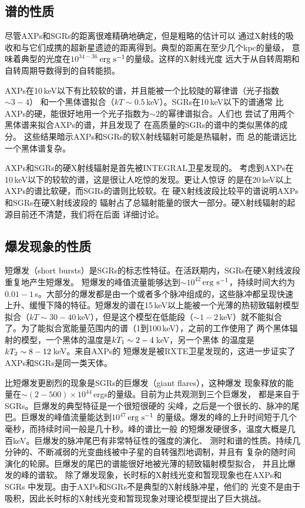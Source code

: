 \subsection{谱的性质}

尽管AXPs和SGRs的距离很难精确地确定，但是粗略的估计可以
通过X射线的吸收和与它们成携的超新星遗迹的距离得到。典型的距离在至少几个kpc的量级，
意味着典型的光度在$10^{34-36}$\,$\rm{erg\ s^{-1}}$的量级。这样的X射线光度
远大于从自转周期和自转周期导数得到的自转能损。

AXPs在10\,keV以下有比较软的谱，并且能被一个比较陡的幂律谱（光子指数$\sim3-4$）
和一个黑体谱拟合（$kT\sim0.5$\,keV）。SGRs在10\,keV以下的谱通常
比AXPs的硬，能很好地用一个光子指数为$\sim2$的幂律谱拟合。人们也
尝试了用两个黑体谱来拟合AXPs的谱\supercite{m08,hg05}，并且发现了
在高质量的SGRs的谱中的类似黑体的成分\supercite{m08,mte+05,met+06}。
这些结果暗示AXPs和SGRs的软X射线辐射可能是热辐射，而
总的能谱远比一个黑体谱复杂\supercite{m08}。

AXPs和SGRs的硬X射线辐射是首先被INTEGRAL卫星发现的\supercite{khm04,dhk+06,mgm+05,gmt+06}。
考虑到AXPs在10\,keV以下的较软的谱，这是很让人吃惊的发现。更让人惊讶
的是在20\,keV以上AXPs的谱比软硬，而SGRs的谱则比较软。在
硬X射线波段比较平的谱说明AXPs和SGRs在硬X射线波段的
辐射占了总辐射能量的很大一部分。硬X射线辐射的起源目前还不清楚，我们将在后面
详细讨论。

\subsection{爆发现象的性质}

短爆发（short bursts）是SGRs的标志性特征。在活跃期内，SGRs在硬X射线波段重复地产生短爆发。
短爆发的峰值流量能够达到$\sim10^{42}$\,$\rm{erg\ s^{-1}}$，持续时间大约为
$0.01-1$\,s。大部分的爆发都是由一个或者多个脉冲组成的，这些脉冲都呈现快速
上升、缓慢下降的特征。短爆发的谱在15\,keV以上能被一个光薄的热韧致辐射模型
拟合（$kT\sim30-40$\,keV），但是这个模型在低能段（$\sim1-2$\,keV）就不能拟合
了\supercite{flu94}。为了能拟合宽能量范围内的谱（1到100\,keV），之前的工作使用了
两个黑体辐射的模型，一个黑体的温度是$kT_{\rm{1}}\sim2-4$\,keV，另一个黑体
的温度是$kT_{\rm{2}}\sim8-12$\,keV\supercite{fcm+04}。来自AXPs的
短爆发是被RXTE卫星发现的\supercite{klc00,kgw+03}，这进一步证实了AXPs和SGRs是同一类天体。

比短爆发更剧烈的现象是SGRs的巨爆发（giant flares），这种爆发
现象释放的能量在$\sim(2-500)\times10^{44}$\,ergs的量级。目前为止共观测到三个巨爆发，
都是来自于SGRs\supercite{m08}。巨爆发的典型特征是一个很短很硬的
尖峰，之后是一个很长的、脉冲的尾巴。巨爆发的峰值流量能达到$10^{47}$\,$\rm{erg\ s^{-1}}$
的量级。爆发的峰的上升时间短于几个毫秒，而持续时间一般是几十秒。峰的谱比一般
的短爆发硬很多，温度大概是几百keV。巨爆发的脉冲尾巴有非常特征性的强度的演化、
测时和谱的性质。持续几分钟的、不断减弱的光变曲线被中子星的自转强烈地调制，并且有
复杂的随时间演化的轮廓。巨爆发的尾巴的谱能很好地被光薄的韧致辐射模型拟合，
并且比爆发的峰的谱软。
%
除了爆发现象，长时标的X射线光变和暂现现象也在AXPs和SGRs
中发现。由于AXPs和SGRs不是典型的X射线脉冲星，他们的
光变不是由于吸积，因此长时标的X射线光变和暂现现象对理论模型提出了巨大挑战。

